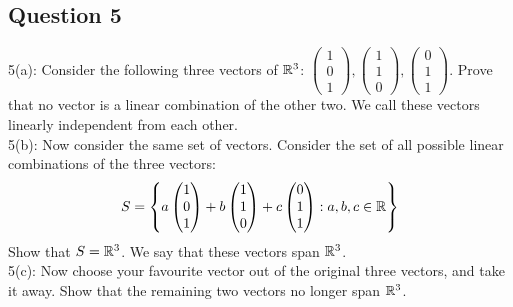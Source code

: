 \documentclass[a4paper]{article}
\begin{document}
\subsection*{Question 5}
5(a): Consider the following three vectors of $\mathbb{R}^3$: $\begin{pmatrix}1 \\ 0 \\ 1\end{pmatrix},\begin{pmatrix}1 \\ 1 \\ 0\end{pmatrix},\begin{pmatrix}0 \\ 1 \\ 1\end{pmatrix}$. Prove that no vector is a linear combination of the other two. We call these vectors linearly independent from each other. \\

5(b): Now consider the same set of vectors. Consider the set of all possible linear combinations of the three vectors: $$S=\left\{a\begin{pmatrix}1 \\ 0 \\ 1\end{pmatrix}+b\begin{pmatrix}1 \\ 1 \\ 0\end{pmatrix}+c\begin{pmatrix}0 \\ 1 \\ 1\end{pmatrix}:a,b,c\in\mathbb{R}\right\}$$ Show that $S=\mathbb{R}^3$. We say that these vectors span $\mathbb{R}^3$. \\

5(c): Now choose your favourite vector out of the original three vectors, and take it away. Show that the remaining two vectors no longer span $\mathbb{R}^3$. 
\end{document}
